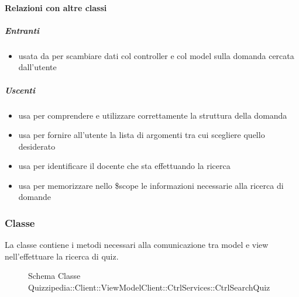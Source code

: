\paragraph{Relazioni con altre classi}
\subparagraph{Entranti}
\begin{itemize}
\item usata da  per scambiare dati col controller e col model sulla domanda cercata dall'utente
\end{itemize}
\subparagraph{Uscenti}
\begin{itemize}
\item usa  per comprendere e utilizzare correttamente la struttura della domanda
\item usa  per fornire all'utente la lista di argomenti tra cui scegliere quello desiderato
\item usa  per identificare il docente che sta effettuando la ricerca
\item usa  per memorizzare nello \$scope le informazioni necessarie alla ricerca di domande
\end{itemize}
\subsubsection{Classe }
La classe contiene i metodi necessari alla comunicazione tra model e view nell'effettuare la ricerca di quiz.
\begin{figure}[H]
\centering
\noindent{}
\caption[Schema Classe CtrlSearchQuiz]{Schema Classe Quizzipedia::Client::ViewModelClient::CtrlServices::CtrlSearchQuiz}
\end{figure}
